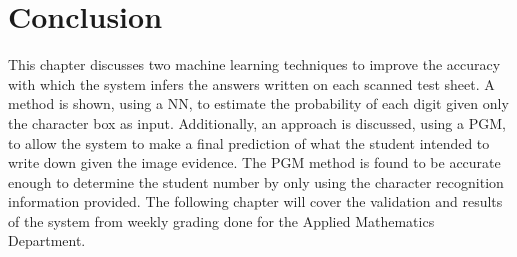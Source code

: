 \section{Conclusion}
This chapter discusses two machine learning techniques to improve the accuracy with which the system infers the answers written on each scanned test sheet. A method is shown, using a NN, to estimate the probability of each digit given only the character box as input. Additionally, an approach is discussed, using a PGM, to allow the system to make a final prediction of what the student intended to write down given the image evidence. The PGM method is found to be accurate enough to determine the student number by only using the character recognition information provided. The following chapter will cover the validation and results of the system from weekly grading done for the Applied Mathematics Department.